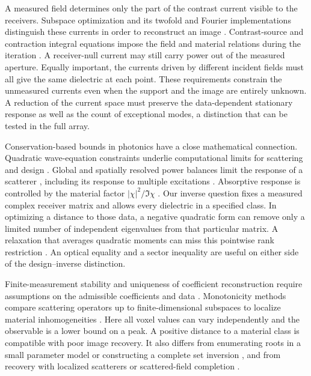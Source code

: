 \documentclass[anonymous,12pt]{iopjournal}
\numberwithin{equation}{section}
\begin{document}
A measured field determines only the part of the contrast current visible to the receivers. Subspace optimization and its twofold and Fourier implementations distinguish these currents in order to reconstruct an image \cite{chen,zhong,ffttsom}. Contrast-source and contraction integral equations impose the field and material relations during the iteration \cite{csi,nie,cie}. A receiver-null current may still carry power out of the measured aperture. Equally important, the currents driven by different incident fields must all give the same dielectric at each point. These requirements constrain the unmeasured currents even when the support and the image are entirely unknown. A reduction of the current space must preserve the data-dependent stationary response as well as the count of exceptional modes, a distinction that can be tested in the full array.

Conservation-based bounds in photonics have a close mathematical connection. Quadratic wave-equation constraints underlie computational limits for scattering and design \cite{angeris19,trivedi,angeris}. Global and spatially resolved power balances limit the response of a scatterer \cite{moleskyglobal,moleskylocal,kuang}, including its response to multiple excitations \cite{shim}. Absorptive response is controlled by the material factor $|\chi|^2/\Im\chi$ \cite{miller}. Our inverse question fixes a measured complex receiver matrix and allows every dielectric in a specified class. In optimizing a distance to those data, a negative quadratic form can remove only a limited number of independent eigenvalues from that particular matrix. A relaxation that averages quadratic moments can miss this pointwise rank restriction \cite{tian}. An optical equality and a sector inequality are useful on either side of the design--inverse distinction.

Finite-measurement stability and uniqueness of coefficient reconstruction require assumptions on the admissible coefficients and data \cite{alberti19,alberti21}. Monotonicity methods compare scattering operators up to finite-dimensional subspaces to localize material inhomogeneities \cite{griesmaier_harrach,griesmaier_harrach_erratum,albicker}. Here all voxel values can vary independently and the observable is a lower bound on a peak. A positive distance to a material class is compatible with poor image recovery. It also differs from enumerating roots in a small parameter model or constructing a complete set inversion \cite{everett96,vasco,sivia}, and from recovery with localized scatterers or scattered-field completion \cite{chai,levinson}.
\end{document}
